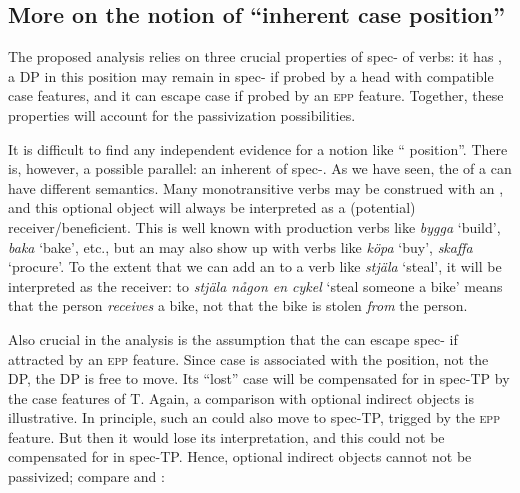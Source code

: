 \documentclass[output=paper]{langscibook}
\begin{document}
\subsection{More on the notion of “inherent case position”}\label{sec:falk:4.4}


The proposed analysis relies on three crucial properties of spec- of  verbs: it has , a DP in this position may remain in spec- if probed by a head with compatible case features, and it can escape case if probed by an \textsc{epp} feature. Together, these properties will account for the passivization possibilities.


It is difficult to find any independent evidence for a notion like “ position”. There is, however, a possible parallel: an inherent  of spec-. As we have seen, the  of a  can have different semantics. Many monotransitive verbs may be construed with an , and this optional object will always be interpreted as a (potential) receiver/beneficient. This is well known with production verbs like \textit{bygga} ‘build’, \textit{baka} ‘bake’, etc., but an  may also show up with verbs like \textit{köpa} ‘buy’, \textit{skaffa} ‘procure’. To the extent that we can add an  to a verb like \textit{stjäla} ‘steal’, it will be interpreted as the receiver: to \textit{stjäla någon en cykel} ‘steal someone a bike’ means that the person \textit{receives} a bike, not that the bike is stolen \textit{from} the person. 



Also crucial in the analysis is the assumption that the  can escape spec- if attracted by an \textsc{epp} feature. Since case is associated with the position, not the DP, the DP is free to move. Its “lost” case will be compensated for in spec-TP by the case features of T. Again, a comparison with optional indirect objects is illustrative. In principle, such an  could also move to spec-TP, trigged by the \textsc{epp} feature. But then it would lose its interpretation, and this could not be compensated for in spec-TP. Hence, optional indirect objects cannot not be passivized; compare  and :


\ea%
    \label{ex:falk:23}
\end{document}
